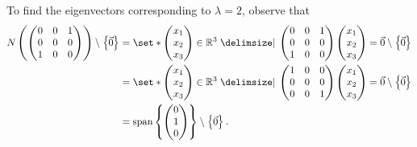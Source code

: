 \documentclass[main.tex]{subfiles}
\begin{document}
\begin{soln}
    To find the eigenvectors corresponding to $\lambda = 2$, observe that
    \begin{align*}
    N\parens{\begin{pmatrix}
        0 & 0 & 1 \\
        0 & 0 & 0 \\
        1 & 0 & 0
    \end{pmatrix}} \setminus\braces{\vec{0}} &= \set*{\begin{pmatrix} x_1 \\ x_2 \\ x_3\end{pmatrix} \in \RR^3\mid \begin{pmatrix}
        0 & 0 & 1 \\
        0 & 0 & 0 \\
        1 & 0 & 0
    \end{pmatrix}\begin{pmatrix} x_1 \\ x_2 \\ x_3\end{pmatrix} = \vec{0}}\setminus \braces{\vec{0}} \\
    &= \set*{\begin{pmatrix} x_1 \\ x_2 \\ x_3\end{pmatrix} \in \RR^3\mid \begin{pmatrix}
        1 & 0 & 0 \\
        0 & 0 & 0 \\
        0 & 0 & 1
    \end{pmatrix}\begin{pmatrix} x_1 \\ x_2 \\ x_3\end{pmatrix} = \vec{0}}\setminus \braces{\vec{0}} \\
    &= \vspan\braces{\begin{pmatrix}
        0 \\
        1 \\
        0
    \end{pmatrix}}\setminus \braces{\vec{0}}.
    \end{align*}


\end{soln}
\end{document}
